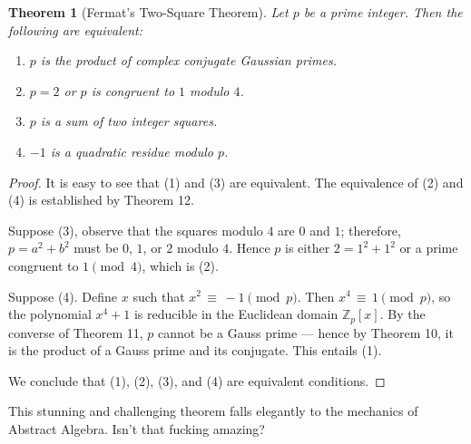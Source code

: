 \documentclass[11pt]{article}
\newtheorem{theorem}{Theorem}
\begin{document}
\begin{adjustwidth}{0.5cm}{}
  \begin{theorem}[Fermat's Two-Square Theorem]
    Let $p$ be a prime integer. Then the following are equivalent:
    \begin{enumerate}
      \item $p$ is the product of complex conjugate Gaussian primes.
      \item $p = 2$ or $p$ is congruent to $1$ modulo $4$.
      \item $p$ is a sum of two integer squares.
      \item $-1$ is a quadratic residue modulo $p$.
    \end{enumerate}
  \end{theorem}
  \begin{proof}
    It is easy to see that (1) and (3) are equivalent. The equivalence of (2) and (4) is established by Theorem 12.

    Suppose (3), observe that the squares modulo $4$ are $0$ and $1$; therefore, $p = a^{2} + b^{2}$ must be $0$, $1$, or $2$ modulo $4$. Hence $p$ is either $2 = 1^{2} + 1^{2}$ or a prime congruent to $1 \pmod{4}$, which is (2).

    Suppose (4). Define $x$ such that $x^{2} \, \equiv \, -1 \pmod{p}$. Then $x^{4} \, \equiv \, 1 \pmod{p}$, so the polynomial $x^{4} + 1$ is reducible in the Euclidean domain $\mathbb{Z}_{p}[x]$. By the converse of Theorem 11, $p$ cannot be a Gauss prime --- hence by Theorem 10, it is the product of a Gauss prime and its conjugate. This entails (1).

    We conclude that (1), (2), (3), and (4) are equivalent conditions.
  \end{proof}
\end{adjustwidth}

This stunning and challenging theorem falls elegantly to the mechanics of Abstract Algebra. Isn't that fucking amazing?

\end{document}
